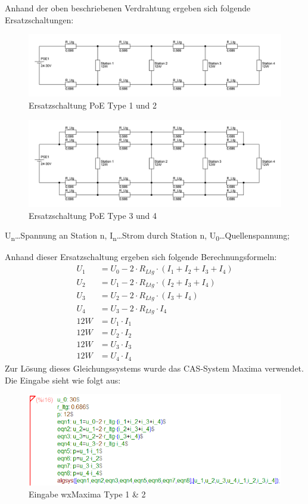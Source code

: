 \documentclass[a4paper, twoside, 12pt, openright]{memoir}
\begin{document}
Anhand der oben beschriebenen Verdrahtung ergeben sich folgende Ersatzschaltungen:
\begin{figure}[H]
	\centering
	\includegraphics[width=\linewidth]{images/berechnung/poe2pair.png}
	\caption{Ersatzschaltung PoE Type 1 und 2}
\end{figure}
\begin{figure}[H]
	\centering
	\includegraphics[width=\linewidth]{images/berechnung/poe4pair_neu.jpg}
	\caption{Ersatzschaltung PoE Type 3 und 4}
\end{figure}
U\textsubscript{n}\dots Spannung an Station n, I\textsubscript{n}\dots Strom durch Station n, U\textsubscript{0}\dots Quellenspannung;\par
Anhand dieser Ersatzschaltung ergeben sich folgende Berechnungsformeln:
\begin{align}
	U_1 &= U_0-2\cdot R_{Ltg}\cdot (I_1+I_2+I_3+I_4)\\
	U_2 &= U_1-2\cdot R_{Ltg}\cdot (I_2+I_3+I_4)\\
	U_3 &= U_2-2\cdot R_{Ltg}\cdot (I_3+I_4)\\
	U_4 &= U_3-2\cdot R_{Ltg}\cdot I_4\\
	12W &= U_1\cdot I_1\\
	12W &= U_2\cdot I_2\\
	12W &= U_3\cdot I_3\\
	12W &= U_4\cdot I_4
\end{align}
Zur Lösung dieses Gleichungssystems wurde das CAS-System Maxima verwendet.
Die Eingabe sieht wie folgt aus:
\begin{figure}[H]
	\centering
	\includegraphics[width=.9\linewidth]{images/berechnung/max_2pair_30V.png}
	\caption{Eingabe wxMaxima Type 1 \& 2}
\end{figure}
\end{document}
